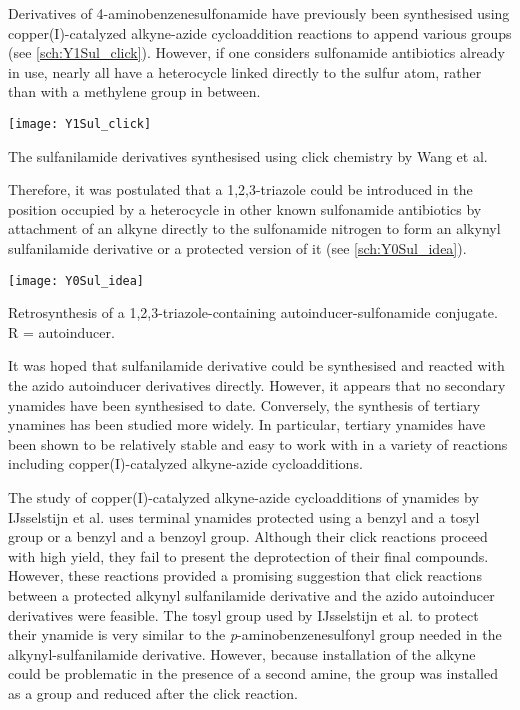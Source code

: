 Derivatives of 4-aminobenzenesulfonamide  have previously been synthesised using copper(I)-catalyzed alkyne-azide cycloaddition reactions to append various groups\cite{Wang2010} (see \ref{sch:Y1Sul_click}). However, if one considers sulfonamide antibiotics already in use, nearly all have a heterocycle linked directly to the sulfur atom, rather than with a methylene group in between. 

\begin{scheme}[H]
	\begin{center}
		\texttt{[image: Y1Sul\_click]}
		\caption{The sulfanilamide derivatives synthesised using click chemistry by Wang et al\cite{Wang2010}.
		\label{sch:Y1Sul_click}}
	\end{center}
\end{scheme}


Therefore, it was postulated that a 1,2,3-triazole could be introduced in the position occupied by a heterocycle in other known sulfonamide antibiotics by attachment of an alkyne directly to the sulfonamide nitrogen to form an alkynyl sulfanilamide derivative  or a protected version of it (see \ref{sch:Y0Sul_idea}).

\begin{scheme}[H]
	\begin{center}
		\texttt{[image: Y0Sul\_idea]}
		\caption{Retrosynthesis of a 1,2,3-triazole-containing autoinducer-sulfonamide conjugate. R = autoinducer.
		\label{sch:Y0Sul_idea}}
	\end{center}
\end{scheme}

It was hoped that sulfanilamide derivative  could be synthesised and reacted with the azido autoinducer derivatives directly. However, it appears that no secondary ynamides have been synthesised to date.
Conversely, the synthesis of tertiary ynamines has been studied more widely\cite{Ficini1976}. In particular, tertiary ynamides have been shown to be relatively stable and easy to work with in a variety of reactions including copper(I)-catalyzed alkyne-azide cycloadditions\cite{IJsselstijn2006,Evano2010}. 

The study of copper(I)-catalyzed alkyne-azide cycloadditions of ynamides by IJsselstijn et al.\cite{IJsselstijn2006} uses terminal ynamides protected using a benzyl and a tosyl group or a benzyl and a benzoyl group. Although their click reactions proceed with high yield, they fail to present the deprotection of their final compounds. However, these reactions provided a promising suggestion that click reactions between a protected alkynyl sulfanilamide derivative and the azido autoinducer derivatives were feasible. The tosyl group used by IJsselstijn et al.\cite{IJsselstijn2006} to protect their ynamide is very similar to the \textit{p}-aminobenzenesulfonyl group needed in the alkynyl-sulfanilamide derivative. 
However, because installation of the alkyne could be problematic in the presence of a second amine, the  group was installed as a  group and reduced after the click reaction. 

